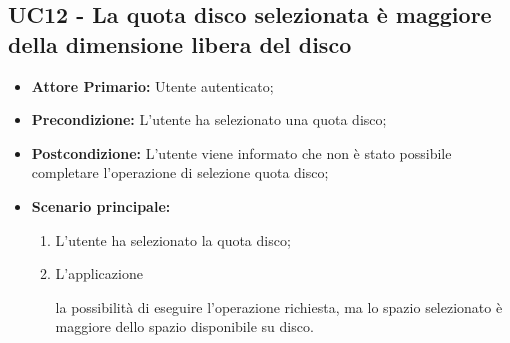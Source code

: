 \subsection{UC12 - La quota disco selezionata è maggiore della dimensione libera del disco}
\label{UC12}
\begin{itemize}
\item \textbf{Attore Primario:} Utente autenticato;
\item \textbf{Precondizione:} L'utente ha selezionato una quota disco;
\item \textbf{Postcondizione:} L'utente viene informato che non è stato possibile completare l'operazione di selezione quota disco;
\item \textbf{Scenario principale:}
    \begin{enumerate}
    \item L'utente ha selezionato la quota disco;
    \item L'applicazione  la possibilità di eseguire l'operazione richiesta, ma lo spazio selezionato è maggiore dello spazio disponibile su disco.
    \end{enumerate}
\end{itemize}